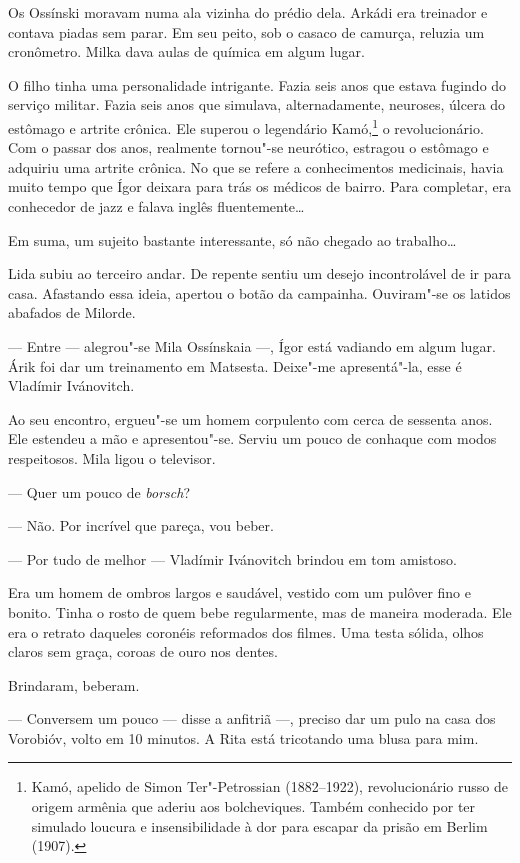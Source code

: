 Os Ossínski moravam numa ala vizinha do prédio dela. Arkádi era treinador e
contava piadas sem parar. Em seu peito, sob o casaco de camurça, reluzia
um cronômetro. Milka dava aulas de química em algum lugar.

O filho tinha uma personalidade intrigante. Fazia seis anos que estava
fugindo do serviço militar. Fazia seis anos que simulava,
alternadamente, neuroses, úlcera do estômago e artrite crônica. Ele
superou o legendário Kamó,\footnote{Kamó, apelido de Simon
  Ter"-Petrossian (1882--1922), revolucionário russo de origem armênia
  que aderiu aos bolcheviques. Também conhecido por ter simulado loucura
  e insensibilidade à dor para escapar da prisão em Berlim (1907).} o
revolucionário. Com o passar dos anos, realmente tornou"-se neurótico,
estragou o estômago e adquiriu uma artrite crônica. No que se refere a
conhecimentos medicinais, havia muito tempo que Ígor deixara para trás
os médicos de bairro. Para completar, era conhecedor de jazz e falava
inglês fluentemente\ldots{}

Em suma, um sujeito bastante interessante, só não chegado ao trabalho\ldots{}

Lida subiu ao terceiro andar. De repente sentiu um desejo incontrolável
de ir para casa. Afastando essa ideia, apertou o botão da campainha.
Ouviram"-se os latidos abafados de Milorde.

--- Entre --- alegrou"-se Mila Ossínskaia ---, Ígor está vadiando em
algum lugar. Árik foi dar um treinamento em Matsesta. Deixe"-me
apresentá"-la, esse é Vladímir Ivánovitch.

Ao seu encontro, ergueu"-se um homem corpulento com cerca de sessenta
anos. Ele estendeu a mão e apresentou"-se. Serviu um pouco de conhaque
com modos respeitosos. Mila ligou o televisor.

--- Quer um pouco de \emph{borsch}?

--- Não. Por incrível que pareça, vou beber.

--- Por tudo de melhor --- Vladímir Ivánovitch brindou em tom amistoso.

Era um homem de ombros largos e saudável, vestido com um pulôver fino e
bonito. Tinha o rosto de quem bebe regularmente, mas de maneira
moderada. Ele era o retrato daqueles coronéis reformados dos filmes. Uma
testa sólida, olhos claros sem graça, coroas de ouro nos dentes.

Brindaram, beberam.

--- Conversem um pouco --- disse a anfitriã ---, preciso dar um pulo na
casa dos Vorobióv, volto em 10 minutos. A Rita está tricotando uma blusa
para mim.

